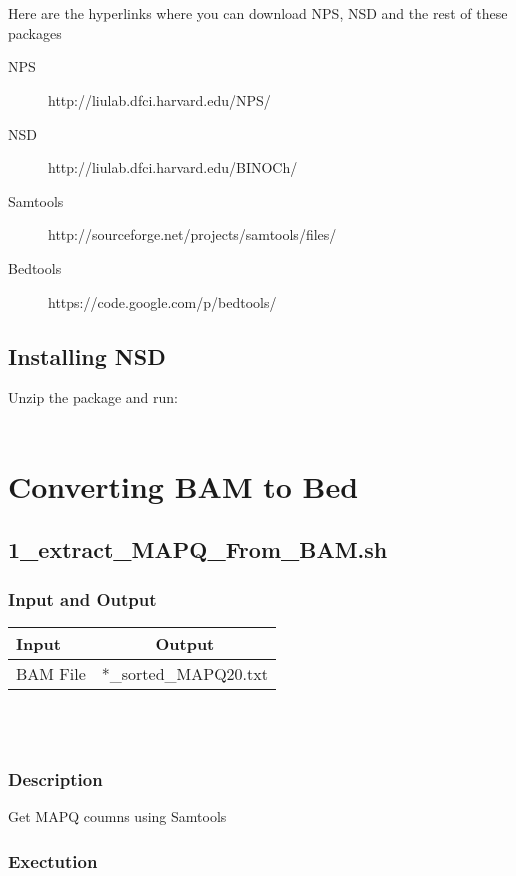 \documentclass[14pt]{article}
\begin{document}
\\
\\
Here are the hyperlinks where you can download NPS, NSD and the rest of these packages
\begin{description}
\item[NPS] http://liulab.dfci.harvard.edu/NPS/
\item[NSD] http://liulab.dfci.harvard.edu/BINOCh/
\item[Samtools] http://sourceforge.net/projects/samtools/files/ 
\item[Bedtools]  https://code.google.com/p/bedtools/
\end{description}
\subsection{Installing NSD}
Unzip the package and run:\\ 

\\

	
\section{Converting BAM to Bed}
\subsection{1\_extract\_MAPQ\_From\_BAM.sh}
\subsubsection{Input and Output}
\begin{tabular}{l |c }

Input & Output \\
\hline
BAM File & *\_sorted\_MAPQ20.txt\\
\end{tabular}\\
\\
\subsubsection{Description}
Get MAPQ coumns using Samtools
\\
\subsubsection{Exectution}
\\
\end{document}
